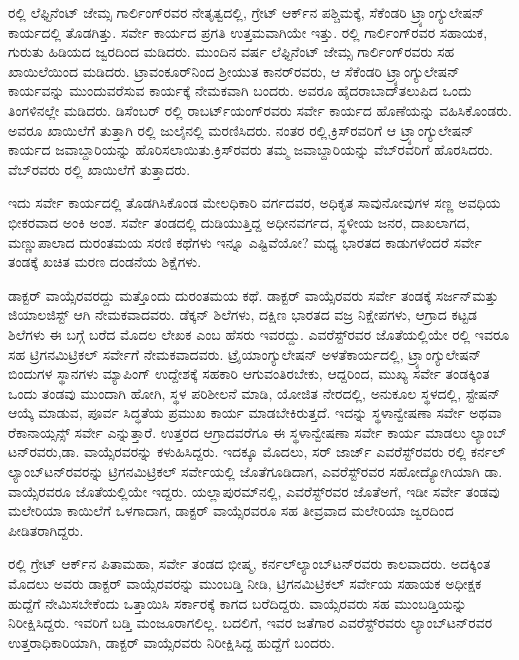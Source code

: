 ರಲ್ಲಿ ಲೆಫ್ಟಿನೆಂಟ್​ ಜೇಮ್ಸ ಗಾರ್ಲಿಂಗ್​ರವರ ನೇತೃತ್ವದಲ್ಲಿ, ಗ್ರೇಟ್​ ಆರ್ಕ್‌ನ ಪಶ್ಚಿಮಕ್ಕೆ, ಸೆಕೆಂಡರಿ ಟ್ರ್ಯಾಂಗ್ಯುಲೇಷನ್​ ಕಾರ್ಯದಲ್ಲಿ ತೊಡಗಿತ್ತು. ಸರ್ವೇ ಕಾರ್ಯದ ಪ್ರಗತಿ ಉತ್ತಮವಾಗಿಯೇ ಇತ್ತು. ರಲ್ಲಿ ಗಾರ್ಲಿಂಗ್​ರವರ ಸಹಾಯಕ, ಗುರುತು ಹಿಡಿಯದ ಜ್ವರದಿಂದ ಮಡಿದರು. ಮುಂದಿನ ವರ್ಷ ಲೆಫ್ಟಿನೆಂಟ್​ ಜೇಮ್ಸ ಗಾರ್ಲಿಂಗ್​ರವರು ಸಹ ಖಾಯಿಲೆಯಿಂದ ಮಡಿದರು. ಟ್ರಾವಂಕೂರ್​ನಿಂದ ಶ‍್ರೀಯುತ ಕಾನರ್​ರವರು, ಆ ಸೆಕೆಂಡರಿ ಟ್ರ್ಯಾಂಗ್ಯುಲೇಷನ್​ ಕಾರ್ಯವನ್ನು ಮುಂದುವರೆಸುವ ಕಾರ್ಯಕ್ಕೆ ನೇಮಕವಾಗಿ ಬಂದರು. ಅವರೂ ಹೈದರಾಬಾದ್​ ತಲುಪಿದ ಒಂದು ತಿಂಗಳಿನಲ್ಲೇ ಮಡಿದರು. ಡಿಸೆಂಬರ್​ ರಲ್ಲಿ ರಾಬರ್ಟ್‌ಯಂಗ್​ರವರು ಸರ್ವೇ ಕಾರ್ಯದ ಹೊಣೆಯನ್ನು ವಹಿಸಿಕೊಂಡರು. ಅವರೂ ಖಾಯಿಲೆಗೆ ತುತ್ತಾಗಿ ರಲ್ಲಿ ಜುಲೈನಲ್ಲಿ ಮರಣಿಸಿದರು. ನಂತರ ರಲ್ಲಿ,\break ಕ್ರಿಸ್​ರವರಿಗೆ ಆ ಟ್ರ್ಯಾಂಗ್ಯುಲೇಷನ್​ ಕಾರ್ಯದ ಜವಾಬ್ದಾರಿಯನ್ನು ಹೊರಿಸಲಾಯಿತು.\break ಕ್ರಿಸ್​ರವರು ತಮ್ಮ ಜವಾಬ್ದಾರಿಯನ್ನು ವೆಬ್​ರವರಿಗೆ ಹೊರಸಿದರು. ವೆಬ್​ರವರು ರಲ್ಲಿ ಖಾಯಿಲೆಗೆ ತುತ್ತಾದರು.

ಇದು ಸರ್ವೇ ಕಾರ್ಯದಲ್ಲಿ ತೊಡಗಿಸಿಕೊಂಡ ಮೇಲಧಿಕಾರಿ ವರ್ಗದವರ, ಅಧಿಕೃತ ಸಾವುನೋವುಗಳ ಸಣ್ಣ ಅವಧಿಯ ಭೀಕರವಾದ ಅಂಕಿ ಅಂಶ. ಸರ್ವೇ ತಂಡದಲ್ಲಿ ದುಡಿಯುತ್ತಿದ್ದ ಅಧೀನವರ್ಗದ, ಸ್ಥಳೀಯ ಜನರ, ದಾಖಲಾಗದ, ಮಣ್ಣುಪಾಲಾದ ದುರಂತಮಯ ಸರಣಿ ಕಥೆಗಳು ಇನ್ನೂ ಎಷ್ಟಿವೆಯೋ? ಮಧ್ಯ ಭಾರತದ ಕಾಡುಗಳೆಂದರೆ ಸರ್ವೇ ತಂಡಕ್ಕೆ ಖಚಿತ ಮರಣ ದಂಡನೆಯ ಶಿಕ್ಷೆಗಳು.

ಡಾಕ್ಟರ್​ ವಾಯ್ಸೆರವರದ್ದು ಮತ್ತೊಂದು ದುರಂತಮಯ ಕಥೆ. ಡಾಕ್ಟರ್​ ವಾಯ್ಸೆರವರು ಸರ್ವೇ ತಂಡಕ್ಕೆ ಸರ್ಜನ್​ ಮತ್ತು ಜಿಯಾಲಜಿಸ್ಟ್​ ಆಗಿ ನೇಮಕವಾದವರು. ಡೆಕ್ಕನ್​ ಶಿಲೆಗಳು, ದಕ್ಷಿಣ ಭಾರತದ ವಜ್ರ ನಿಕ್ಷೇಪಗಳು, ಆಗ್ರಾದ ಕಟ್ಟಡ ಶಿಲೆಗಳು ಈ ಬಗ್ಗೆ ಬರೆದ ಮೊದಲ ಲೇಖಕ ಎಂಬ ಹೆಸರು ಇವರದ್ದು. ಎವರೆಸ್ಟ್​ರವರ ಜೊತೆಯಲ್ಲಿಯೇ ರಲ್ಲಿ ಇವರೂ ಸಹ ಟ್ರಿಗನಮಿಟ್ರಿಕಲ್​ ಸರ್ವೇಗೆ ನೇಮಕವಾದವರು. ಟ್ರೈಯಾಂಗ್ಯುಲೇಷನ್​ ಅಳತೆ\break ಕಾರ್ಯದಲ್ಲಿ, ಟ್ರ್ಯಾಂಗ್ಯುಲೇಷನ್​ ಬಿಂದುಗಳ ಸ್ಥಾನಗಳು ಮ್ಯಾಪಿಂಗ್​ ಉದ್ದೇಶಕ್ಕೆ ಸಹಕಾರಿ ಆಗುವಂತಿರಬೇಕು, ಆದ್ದರಿಂದ, ಮುಖ್ಯ ಸರ್ವೇ ತಂಡಕ್ಕಿಂತ ಒಂದು ತಂಡವು ಮುಂದಾಗಿ ಹೋಗಿ, ಸ್ಥಳ ಪರಿಶೀಲನೆ ಮಾಡಿ, ಯೋಜಿತ ನೇರದಲ್ಲಿ, ಅನುಕೂಲ ಸ್ಥಳದಲ್ಲಿ, ಸ್ಟೇಷನ್​ ಆಯ್ಕೆ ಮಾಡುವ, ಪೂರ್ವ ಸಿದ್ಧತೆಯ ಪ್ರಮುಖ ಕಾರ್ಯ ಮಾಡಬೇಕಿರುತ್ತದೆ. ಇದನ್ನು ಸ್ಥಳಾನ್ವೇಷಣಾ ಸರ್ವೇ ಅಥವಾ ರೆಕಾನಾಯ್ಸನ್ಸ್​ ಸರ್ವೇ ಎನ್ನುತ್ತಾರೆ. ಉತ್ತರದ ಆಗ್ರಾದವರೆಗೂ ಈ ಸ್ಥಳಾನ್ವೇಷಣಾ ಸರ್ವೇ ಕಾರ್ಯ ಮಾಡಲು ಲ್ಯಾಂಬ್​ಟನ್​ರವರು,\break ಡಾ. ವಾಯ್ಸೆರವರನ್ನು ಕಳುಹಿಸಿದ್ದರು. ಇದಕ್ಕೂ ಮೊದಲು, ಸರ್​ ಜಾರ್ಜ್ ಎವರೆಸ್ಟ್​ರವರು ರಲ್ಲಿ ಕರ್ನಲ್​ ಲ್ಯಾಂಬ್​ಟನ್​ರವರನ್ನು ಟ್ರಿಗನಮಿಟ್ರಿಕಲ್​ ಸರ್ವೇಯಲ್ಲಿ ಜೊತೆಗೂಡಿದಾಗ, ಎವರೆಸ್ಟ್​ರವರ ಸಹೋದ್ಯೋಗಿಯಾಗಿ ಡಾ. ವಾಯ್ಸೆರವರೂ ಜೊತೆಯಲ್ಲಿಯೇ ಇದ್ದರು. ಯಲ್ಲಾಪುರಮ್‌ನಲ್ಲಿ, ಎವರೆಸ್ಟ್​ರವರ ಜೊತೆಅಗೆ, ಇಡೀ ಸರ್ವೇ ತಂಡವು ಮಲೇರಿಯಾ ಕಾಯಿಲೆಗೆ ಒಳಗಾದಾಗ, ಡಾಕ್ಟರ್​ ವಾಯ್ಸೆರವರೂ ಸಹ ತೀವ್ರವಾದ ಮಲೇರಿಯಾ ಜ್ವರದಿಂದ ಪೀಡಿತರಾಗಿದ್ದರು.

ರಲ್ಲಿ ಗ್ರೇಟ್​ ಆರ್ಕ್‌ನ ಪಿತಾಮಹಾ, ಸರ್ವೇ ತಂಡದ ಭೀಷ್ಮ, ಕರ್ನಲ್​\break ಲ್ಯಾಂಬ್​ಟನ್​ರವರು ಕಾಲವಾದರು. ಅದಕ್ಕಿಂತ ಮೊದಲು ಅವರು ಡಾಕ್ಟರ್​ ವಾಯ್ಸೆರವರನ್ನು ಮುಂಬಡ್ತಿ ನೀಡಿ, ಟ್ರಿಗನಮಿಟ್ರಿಕಲ್​ ಸರ್ವೇಯ ಸಹಾಯಕ ಅಧೀಕ್ಷಕ ಹುದ್ದೆಗೆ ನೇಮಿಸಬೇಕೆಂದು ಒತ್ತಾಯಿಸಿ ಸರ್ಕಾರಕ್ಕೆ ಕಾಗದ ಬರೆದಿದ್ದರು. ವಾಯ್ಸೆರವರು ಸಹ ಮುಂಬಡ್ತಿಯನ್ನು ನಿರೀಕ್ಷಿಸಿದ್ದರು. ಇವರಿಗೆ ಬಡ್ತಿ ಮಂಜೂರಾಗಲಿಲ್ಲ. ಬದಲಿಗೆ, ಇವರ ಜತೆಗಾರ ಎವರೆಸ್ಟ್​ರವರು ಲ್ಯಾಂಬ್​ಟನ್​ರವರ ಉತ್ತರಾಧಿಕಾರಿಯಾಗಿ, ಡಾಕ್ಟರ್​ ವಾಯ್ಸೆರವರು ನಿರೀಕ್ಷಿಸಿದ್ದ ಹುದ್ದೆಗೆ ಬಂದರು.

